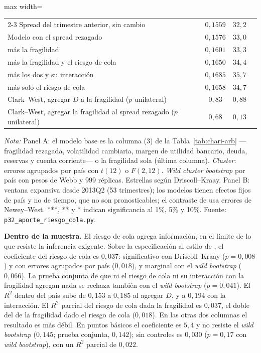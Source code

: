 \begin{table}[htbp]
\begin{adjustbox}{max width=\linewidth}
\begin{tabular}{l ccc}
\cmidrule(lr){2-3}
\quad Spread del trimestre anterior, sin cambio & $0{,}1559$ & $32{,}2$ & \\
\quad Modelo con el spread rezagado & $0{,}1576$ & $33{,}0$ & \\
\quad \quad más la fragilidad & $0{,}1601$ & $33{,}3$ & \\
\quad \quad más la fragilidad y el riesgo de cola & $0{,}1650$ & $34{,}4$ & \\
\quad \quad más los dos y su interacción & $0{,}1685$ & $35{,}7$ & \\
\quad \quad más solo el riesgo de cola & $0{,}1658$ & $34{,}7$ & \\
\quad Clark--West, agregar $D$ a la fragilidad ($p$ unilateral) & $0{,}83$ & $0{,}88$ & \\
\quad Clark--West, agregar la fragilidad al spread rezagado ($p$ unilateral) & $0{,}68$ & $0{,}13$ & \\
\bottomrule
\end{tabular}
\end{adjustbox}
\par\smallskip\parbox{0.95\linewidth}{\footnotesize \textit{Nota:} Panel A: el modelo base es la columna (3) de la Tabla~\ref{tab:chari-arb} ---fragilidad rezagada, volatilidad cambiaria, margen de utilidad bancario, deuda, reservas y cuenta corriente--- o la fragilidad sola (última columna). \textit{Cluster}: errores agrupados por país con $t(12)$ o $F(2,12)$. \textit{Wild cluster bootstrap} por país con pesos de Webb y 999 réplicas. Estrellas según Driscoll--Kraay. Panel B: ventana expansiva desde 2013Q2 (53 trimestres); los modelos tienen efectos fijos de país y no de tiempo, que no son pronosticables; el contraste de \citet{ClarkWest2007} usa errores de Newey--West. ***, ** y * indican significancia al 1\%, 5\% y 10\%. Fuente: \texttt{p32\_aporte\_riesgo\_cola.py}.}
\end{table}

\textbf{Dentro de la muestra.} El riesgo de cola agrega información, en el límite de lo que resiste la inferencia exigente. Sobre la especificación al estilo de \citet{Chari2024b}, el coeficiente del riesgo de cola es $0{,}037$: significativo con Driscoll--Kraay ($p=0{,}008$) y con errores agrupados por país ($0{,}018$), y marginal con el \textit{wild bootstrap} ($0{,}066$). La prueba conjunta de que ni el riesgo de cola ni su interacción con la fragilidad agregan nada se rechaza también con el \textit{wild bootstrap} ($p=0{,}041$). El $R^2$ dentro del país sube de $0{,}153$ a $0{,}185$ al agregar $D$, y a $0{,}194$ con la interacción. El $R^2$ parcial del riesgo de cola dada la fragilidad es $0{,}037$, el doble del de la fragilidad dado el riesgo de cola ($0{,}018$). En las otras dos columnas el resultado es más débil. En puntos básicos el coeficiente es $5{,}4$ y no resiste el \textit{wild bootstrap} ($0{,}145$; prueba conjunta, $0{,}142$); sin controles es $0{,}030$ ($p=0{,}17$ con \textit{wild bootstrap}), con un $R^2$ parcial de $0{,}022$.

